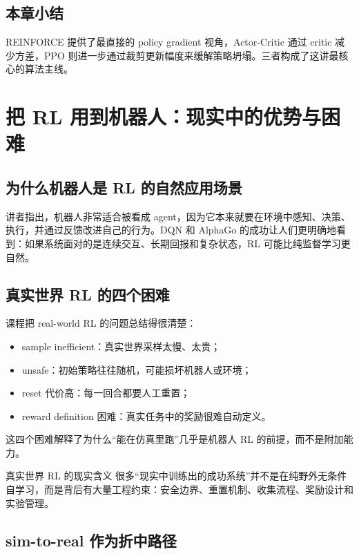 \documentclass[a4paper]{article}
\begin{document}
\subsection{本章小结}

REINFORCE 提供了最直接的 policy gradient 视角，Actor-Critic 通过 critic 减少方差，PPO 则进一步通过裁剪更新幅度来缓解策略坍塌。三者构成了这讲最核心的算法主线。

\section{把 RL 用到机器人：现实中的优势与困难}

\subsection{为什么机器人是 RL 的自然应用场景}

讲者指出，机器人非常适合被看成 agent，因为它本来就要在环境中感知、决策、执行，并通过反馈改进自己的行为。DQN 和 AlphaGo 的成功让人们更明确地看到：如果系统面对的是连续交互、长期回报和复杂状态，RL 可能比纯监督学习更自然。

\subsection{真实世界 RL 的四个困难}

课程把 real-world RL 的问题总结得很清楚：
\begin{itemize}
  \item sample inefficient：真实世界采样太慢、太贵；
  \item unsafe：初始策略往往随机，可能损坏机器人或环境；
  \item reset 代价高：每一回合都要人工重置；
  \item reward definition 困难：真实任务中的奖励很难自动定义。
\end{itemize}

这四个困难解释了为什么“能在仿真里跑”几乎是机器人 RL 的前提，而不是附加能力。

\begin{importantbox}{真实世界 RL 的现实含义}
很多“现实中训练出的成功系统”并不是在纯野外无条件自学习，而是背后有大量工程约束：安全边界、重置机制、收集流程、奖励设计和实验管理。
\end{importantbox}

\subsection{sim-to-real 作为折中路径}
\end{document}

